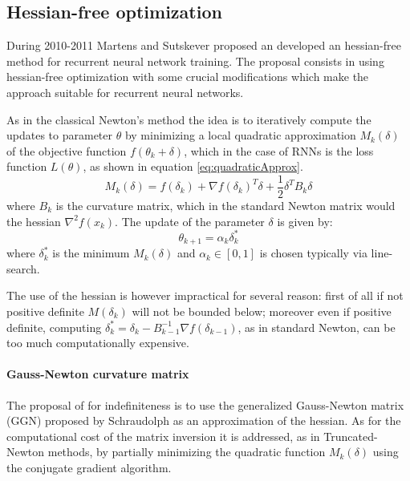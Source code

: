 \subsection{Hessian-free optimization}

During 2010-2011 Martens and Sutskever\cite{hessianFree} proposed an developed an hessian-free method for recurrent neural network training.
The proposal consists in using hessian-free optimization with some crucial modifications which make the approach suitable for recurrent neural networks.

As in  the classical Newton's method the idea is to iteratively compute the updates to parameter $\theta$ by minimizing a local quadratic approximation $M_{k}(\delta)$ of the objective function $f(\theta_k +\delta)$, which in the case of RNNs is the loss function $L(\theta)$, as shown in equation \ref{eq:quadraticApprox}.
\begin{equation}
 M_{k}(\delta) = f(\delta_{k})+\nabla f(\delta_{k})^T \delta +\frac{1}{2}\delta^T B_{k}\delta
 \label{eq:quadraticApprox}
\end{equation}
where $B_k$ is the curvature matrix, which in the standard Newton matrix would the hessian $\nabla^2f(x_k)$.
The update of the parameter $\delta$ is given by:
\begin{equation}
 \theta_{k+1} = \alpha_k\delta_k^* 
\end{equation}
where $\delta_k^*$ is the minimum $M_k(\delta)$ and $\alpha_k\in[0,1]$ is chosen typically via line-search. 

The use of the hessian is however impractical for several reason: first of all if not positive definite $M(\delta_k)$ will not be bounded below; moreover even if positive definite, computing $\delta_k^* = \delta_k - B_{k-1}^{-1}\nabla f(\delta_{k-1})$, as in standard Newton, can be too much computationally expensive.

\paragraph{Gauss-Newton curvature matrix}
The proposal of \cite{hessianFree} for indefiniteness is to use the generalized Gauss-Newton matrix (GGN) proposed by Schraudolph\cite{gaussNewtonMatrix} as an approximation of the hessian. As for the computational cost of the matrix inversion it is addressed, as in Truncated-Newton methods, by partially minimizing the quadratic function $M_{k}(\delta)$ using the conjugate gradient algorithm.


